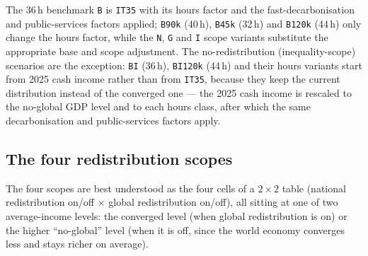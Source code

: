 \documentclass[12pt,a4paper]{article}
\newcommand{\scenario}[1]{\texttt{#1}}
\newcommand{\col}[1]{\texttt{#1}}
\begin{document}
\noindent The 36\,h benchmark \scenario{B} is \col{IT35} with its hours factor and the fast-decarbonisation and public-services factors applied; \scenario{B90k} (40\,h), \scenario{B45k} (32\,h) and \scenario{B120k} (44\,h) only change the hours factor, while the \scenario{N}, \scenario{G} and \scenario{I} scope variants substitute the appropriate base and scope adjustment. The no-redistribution (inequality-scope) scenarios are the exception: \scenario{BI} (36\,h), \scenario{BI120k} (44\,h) and their hours variants start from 2025 cash income rather than from \col{IT35}, because they keep the current distribution instead of the converged one --- the 2025 cash income is rescaled to the no-global GDP level and to each hours class, after which the same decarbonisation and public-services factors apply.



\subsection{The four redistribution scopes}
\label{sec:scopes}

The four scopes are best understood as the four cells of a $2\times2$ table (national redistribution on/off $\times$ global redistribution on/off), all sitting at one of two average-income levels: the converged level (when global redistribution is on) or the higher ``no-global'' level (when it is off, since the world economy converges less and stays richer on average).

\end{document}
